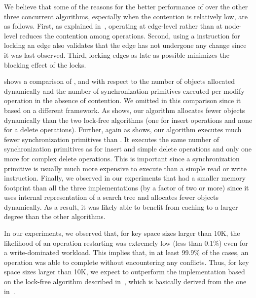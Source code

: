 We believe that some of the reasons for the better performance of  \CASTLE{} over the other three concurrent algorithms, especially when the contention is relatively low,  are as follows. First, as explained in~\cite{NatMit:2014:PPoPP}, operating at edge-level rather than at node-level reduces the contention among operations. Second, using a \CAS{} instruction for locking an edge also validates that the edge has not undergone any change since it was last observed. Third, locking edges as late as possible minimizes the blocking effect of the locks.


 shows a comparison of \HJBST{}, \NMBST{} and \CASTLE{} with respect to the number of objects allocated dynamically and the number of synchronization primitives executed per modify operation in the absence of contention. We omitted \CITRUS{} in this comparison since it based on a different framework. As  shows, our algorithm allocates fewer objects dynamically than the two lock-free algorithms (one for insert operations and none for a delete operations). Further, again as  shows, our algorithm executes  much fewer synchronization primitives than \HJBST{}. It executes the same  number of  synchronization primitives as \NMBST{} for insert and simple delete operations and only one more for complex delete operations. This is important since a synchronization primitive is usually much more expensive to execute than a simple read or write instruction. Finally, we observed in our experiments that \CASTLE{} had a smaller memory footprint than all the three implementations (by a factor of two or more) since it uses internal representation of a search tree and allocates fewer objects dynamically. As a result, it was likely able to benefit from caching to a larger degree than the other algorithms.

In our experiments, we observed that, for key space  sizes larger than 10K, the likelihood of an operation restarting was extremely low (less than 0.1\%) even for a write-dominated workload. This implies that, in at least 99.9\% of the cases, an operation was able to complete without encountering any conflicts. Thus, for key space sizes larger than 10K, we expect \CASTLE{} to outperform the implementation based on the lock-free algorithm described in~\cite{EllFat+:2014:PODC}, which is basically derived from the one in~\cite{EllFat+:2010:PODC}.

%
%